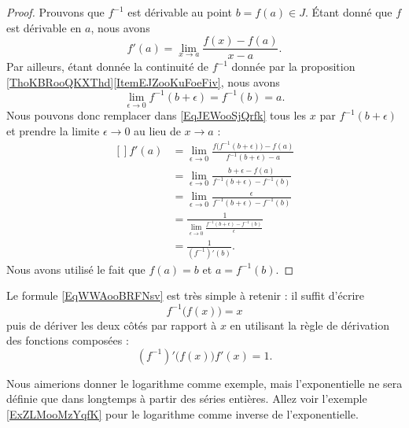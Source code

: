 \begin{proof}
    Prouvons que \( f^{-1}\) est dérivable au point \( b=f(a)\in J\). Étant donné que \( f\) est dérivable en \( a\), nous avons
    \begin{equation}\label{EqJEWooSjQrfk}
        f'(a)=\lim_{x\to a} \frac{ f(x)-f(a) }{ x-a }.
    \end{equation}
    Par ailleurs, étant donnée la continuité de \( f^{-1}\) donnée par la proposition \ref{ThoKBRooQKXThd}\ref{ItemEJZooKuFoeFiv}, nous avons
    \begin{equation}
        \lim_{\epsilon\to 0} f^{-1}(b+\epsilon)=f^{-1}(b)=a.
    \end{equation}
    Nous pouvons donc remplacer dans \eqref{EqJEWooSjQrfk} tous les \( x\) par \( f^{-1}(b+\epsilon)\) et prendre la limite \( \epsilon\to 0\) au lieu de \( x\to a\) :
    \begin{equation}
        \begin{aligned}[]
            f'(a)&=\lim_{\epsilon\to 0}\frac{ f\big( f^{-1}(b+\epsilon) \big)-f(a) }{ f^{-1}(b+\epsilon)-a }\\
            &=\lim_{\epsilon\to 0}\frac{ b+\epsilon-f(a) }{ f^{-1}(b+\epsilon)-f^{-1}(b) }\\
            &=\lim_{\epsilon\to 0}\frac{ \epsilon }{ f^{-1}(b+\epsilon)-f^{-1}(b) }\\
            &=\frac{1}{ \lim_{\epsilon\to 0}\frac{ f^{-1}(b+\epsilon)-f^{-1}(b) }{ \epsilon } }\\
            &=\frac{1}{ (f^{-1})'(b) }.
        \end{aligned}
    \end{equation}
    Nous avons utilisé le fait que \( f(a)=b\) et \( a=f^{-1}(b)\).
\end{proof}

\begin{remark}
    Le formule \eqref{EqWWAooBRFNsv} est très simple à retenir : il suffit d'écrire
    \begin{equation}    
        f^{-1}\big( f(x) \big)=x
    \end{equation}
    puis de dériver les deux côtés par rapport à \( x\) en utilisant la règle de dérivation des fonctions composées :
    \begin{equation}
        (f^{-1})'\big( f(x) \big)f'(x)=1.
    \end{equation}
\end{remark}

\begin{example}
    Nous aimerions donner le logarithme comme exemple, mais l'exponentielle ne sera définie que dans longtemps à partir des séries entières. Allez voir l'exemple \ref{ExZLMooMzYqfK} pour le logarithme comme inverse de l'exponentielle.
\end{example}

